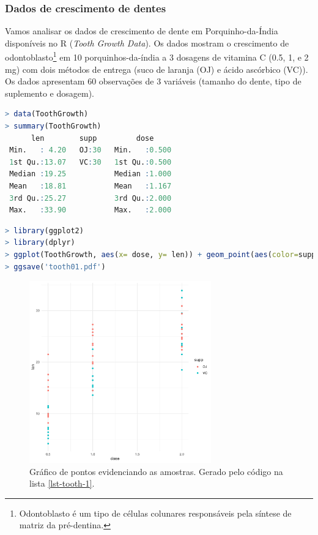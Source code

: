 \begin{frame}
\frametitle{Dados de crescimento de dentes}
Vamos analisar os dados de crescimento de dente em Porquinho-da-Índia disponíveis no R (\emph{Tooth Growth Data}).
Os dados mostram o crescimento de odontoblasto\footnote{Odontoblasto é um tipo de células colunares responsáveis pela síntese de matriz da pré-dentina.}
em 10 porquinhos-da-índia a 3 dosagens de vitamina C (0.5, 1, e 2 mg) com dois métodos de entrega (suco de laranja (OJ) e ácido ascórbico (VC)).
Os dados apresentam 60 observações de 3 variáveis (tamanho do dente, tipo de suplemento e dosagem).

\vspace{3ex}

\begin{lstlisting}[language=R, label=lst-tooth-0, caption={Resumo dos dados.}, postbreak=\mbox{$\hookrightarrow$\space}, basicstyle=\fontsize{8}{10}\selectfont\ttfamily]
> data(ToothGrowth)
> summary(ToothGrowth)
      len        supp         dose      
 Min.   : 4.20   OJ:30   Min.   :0.500  
 1st Qu.:13.07   VC:30   1st Qu.:0.500  
 Median :19.25           Median :1.000  
 Mean   :18.81           Mean   :1.167  
 3rd Qu.:25.27           3rd Qu.:2.000  
 Max.   :33.90           Max.   :2.000  
\end{lstlisting}

\begin{lstlisting}[language=R, label=lst-tooth-1, caption={Gráfico de pontos evidenciando cada amostra.}, postbreak=\mbox{$\hookrightarrow$\space}, basicstyle=\fontsize{8}{10}\selectfont\ttfamily]
> library(ggplot2)
> library(dplyr)
> ggplot(ToothGrowth, aes(x= dose, y= len)) + geom_point(aes(color=supp)) + theme_minimal()
> ggsave('tooth01.pdf')
\end{lstlisting}

\begin{figure}[h]
 \centering
  \includegraphics[width=0.7\textwidth,height=0.7\textheight,keepaspectratio]{figures/tooth01.pdf}
 \caption{Gráfico de pontos evidenciando as amostras. Gerado pelo código na lista \ref{lst-tooth-1}.}
 \label{fig-tooth01}
\end{figure}


\end{frame}
